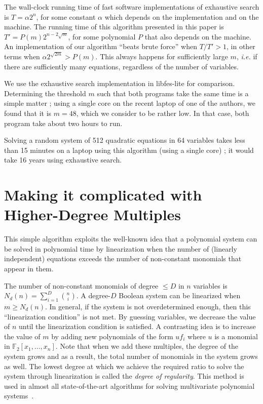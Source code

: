 \documentclass[a4paper,UKenglish,cleveref, autoref]{lipics-v2019}
\begin{document}
The wall-clock running time of fast software implementations of exhaustive
search is $T = \alpha 2^n$, for some constant $\alpha$ which depends on the
implementation and on the machine. The running time of this algorithm presented
in this paper is $T' = P(m) 2^{n - 2\sqrt{m}}$, for some polynomial $P$ that
also depends on the machine. An implementation of our algorithm ``beats brute
force'' when $T/T' > 1$, in other terms when
$\alpha 2^{\sqrt{2m}} > P(m)$. This always happens for sufficiently large
$m$, \textit{i.e.} if there are sufficiently many equations, regardless of the
number of variables.

We use the exhaustive search implementation in \textsf{libfes-lite} for
comparison. Determining the threshold $m$ such that both programs take the same
time is a simple matter ; using a single core on the recent laptop of one of the
authors, we found that it is $m=48$, which we consider to be rather low. In that
case, both program take about two hours to run.

Solving a random system of 512 quadratic equations in 64 variables takes less
than 15 minutes on a laptop using this algorithm (using a single core) ; it
would take 16 years using exhaustive search.


\section{Making it complicated with Higher-Degree Multiples}
\label{sec:extensions}

This simple algorithm exploits the well-known idea that a polynomial system can
be solved in polynomial time by linearization when the number of (linearly
independent) equations exceeds the number of non-constant monomials that appear
in them.

The number of non-constant monomials of degree $\leq D$ in $n$ variables is
$N_d(n) = \sum_{i=1}^D \binom{n}{i}$. A degree-$D$ Boolean system can be
linearized when $m \geq N_d(n)$. In general, if the system is not overdetermined
enough, then this ``linearization condition'' is not met. By guessing variables,
we decrease the value of $n$ until the linearization condition is satisfied. A
contrasting idea is to increase the value of $m$ by adding new polynomials of
the form $uf_i$ where $u$ is a monomial in $\mathbb{F}_2[x_1, \dots, x_n]$.
Note that when we add these multiples, the degree of the system grows and as a
result, the total number of monomials in the system grows as well. The lowest
degree at which we achieve the required ratio to solve the system through
linearization is called the \textit{degree of regularity}. This method is used
in almost all state-of-the-art algorithms for solving multivariate polynomial
systems~\cite{F4,F5,CourtoisKPS00,BardetFSS13,JouxV17}.
\end{document}
